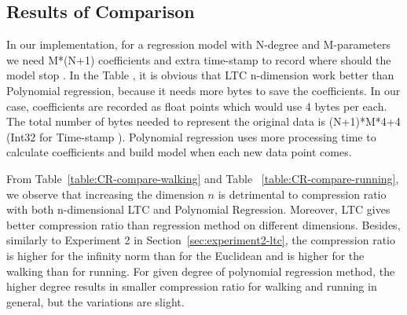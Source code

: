 \subsection{Results of Comparison}
In our implementation, for a regression model with N-degree and
M-parameters we need M*(N+1) coefficients and extra time-stamp to record
where should the model stop . In the Table , it is obvious that LTC n-dimension work
better  than Polynomial regression, because it needs more bytes to save the
coefficients. In our case, coefficients are recorded as float points  which would
use 4 bytes per each. The total number of bytes needed to represent the original
data is (N+1)*M*4+4 (Int32 for Time-stamp ). Polynomial regression uses more
processing time  to calculate coefficients and build model when each new data
point comes. 

From Table~\ref{table:CR-compare-walking} and Table
~\ref{table:CR-compare-running}, we observe that increasing the dimension $n$
is detrimental to compression ratio with both n-dimensional LTC and Polynomial
Regression. Moreover, LTC gives better compression ratio than regression method on
different dimensions.  Besides,
similarly to Experiment 2 in
Section~\ref{sec:experiment2-ltc}, the compression ratio is higher for the
infinity norm than for the Euclidean and is higher for the walking than for
running. For given degree of polynomial regression method, the higher degree
results in smaller compression ratio for walking and running in general, but the
variations are slight.  



